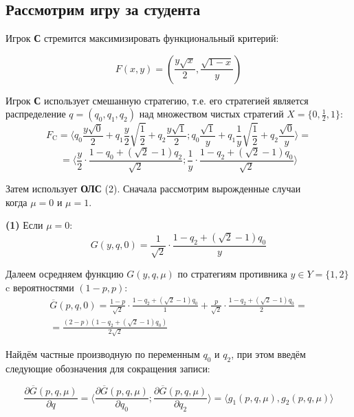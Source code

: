\subsection{Рассмотрим игру за студента}
\begin{flushleft}

	Игрок \textbf{С} стремится максимизировать функциональный критерий: 
	
	$$F(x, y) = (\frac{y\sqrt{x}}{2},\frac{\sqrt{1-x}}{y})$$	

	Игрок \textbf{С} использует смешанную стратегию, т.е. его стратегией является
	распределение $q=(q_0,q_1,q_2)$ над множеством чистых стратегий 
	$X=\{0,\frac{1}{2},1\}$:\\

	$$
		F_\textrm{C}=
		\big \langle
			q_0\frac{y\sqrt{0}}{2} + 
			q_1\frac{y}{2} \sqrt{\frac{1}{2}} + 
			q_2\frac{y\sqrt{1}}{2};
			q_0\frac{\sqrt{1}}{y} +
			q_1\frac{1}{y} \sqrt{\frac{1}{2}} +
			q_2\frac{\sqrt{0}}{y}
		\big \rangle = 
	$$
	$$
		=\big \langle
			\frac{y}{2}\cdot\frac{1-q_0+(\sqrt{2}-1)q_2}{\sqrt{2}};
			\frac{1}{y}\cdot\frac{1-q_2+(\sqrt{2}-1)q_0}{\sqrt{2}}
		\big \rangle
	$$	
	
	Затем использует \textbf{ОЛС} (2). Сначала рассмотрим вырожденные случаи \\
	когда $\mu=0$ и  $\mu=1$. 


	\textbf{(1)} Если $\mu=0$:
	$$
		G(y,q,0)=\frac{1}{\sqrt{2}}\cdot \frac{1-q_2+(\sqrt{2}-1)q_0}{y}
	$$	
	
	Далеем осредняем функцию $G(y,q,\mu)$ по стратегиям 
	противника $y \in Y=\{1,2\}$ c вероятностями $(1-p,p)$:
	\begin{gather*}
		\overline G(p,q,0)=
		\frac{1-p}{\sqrt{2}} \cdot \frac{1-q_2+(\sqrt{2}-1)q_0}{1}+
		\frac{p}{\sqrt{2}} \cdot \frac{1-q_2+(\sqrt{2}-1)q_0}{2}=\\
		=\frac{(2-p)(1-q_2+(\sqrt{2}-1)q_0)}{2\sqrt{2}}
	\end{gather*}
	
	Найдём частные производную по переменным $q_0$ и $q_2$, при этом
	введём следующие обозначения для сокращения записи:
	
	\begin{equation}\label{eq:G_dericative}
		\frac{\partial \overline G(p,q,\mu)}{\partial q}
		=\langle \frac{\partial \overline G(p,q,\mu)}{\partial q_0};
		\frac{\partial \overline G(p,q,\mu)}{\partial q_2} \rangle=
		\langle g_1(p,q,\mu), g_2(p,q,\mu) \rangle
	\end{equation}


\end{flushleft}
